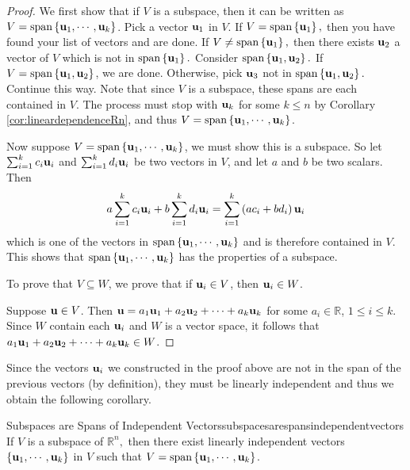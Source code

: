 \begin{proof}
We first show that if $V$ is a subspace, then it can be written as $V= \mbox{span}\left\{ {\bf u}_{1},\cdots ,{\bf u}_{k}\right\}$. Pick a vector ${\bf u}_{1}$ in $V$. If $V=
\mbox{span}\left\{ {\bf u}_{1}\right\} ,$ then you have found your
list of vectors and are done. If $V\neq \mbox{span}\left\{ {\bf u}_{1}\right\} ,$ then
there exists ${\bf u}_{2}$ a vector of $V$ which is not in $
\mbox{span}\left\{ {\bf u}_{1}\right\} .$ Consider $\mbox{span}\left\{ 
{\bf u}_{1},{\bf u}_{2}\right\}.$ 
If $V=\mbox{span}\left\{ {\bf u}_{1},{\bf u}_{2}\right\}$, we are
done. Otherwise, pick ${\bf u}_{3}$ not in $\mbox{span}\left\{ {\bf u}_{1},{\bf u}_{2}\right\} .$ Continue this way.
Note that since $V $ is a subspace, these spans are each contained in
$V$.  The process must stop with ${\bf u}_{k}$ for some $k\leq n$
by Corollary \ref{cor:lineardependenceRn}, and thus $V=\mbox{span}\left\{ {\bf u}_{1},\cdots ,
{\bf u}_{k}\right\}$.

Now suppose $V=\mbox{span}\left\{ {\bf u}_{1},\cdots ,
{\bf u}_{k}\right\}$, we must show this is a subspace. So let $\sum_{i=1}^{k}c_{i}{\bf u}_{i}$ and $
\sum_{i=1}^{k}d_{i}{\bf u}_{i}$ be two vectors in $V$, and let $a$
and $b$ be two scalars. Then 
\begin{equation*}
a \sum_{i=1}^{k}c_{i}{\bf u}_{i}+ b \sum_{i=1}^{k}d_{i}{\bf u}_{i}=
 \sum_{i=1}^{k}\left( a c_{i}+b  d_{i}\right) {\bf u}_{i}
\end{equation*}
which is one of the vectors in $\mbox{span}\left\{ {\bf u}_{1},\cdots ,
{\bf u}_{k}\right\}$ and is therefore contained in $V$. This shows that $\mbox{span}\left\{ {\bf u}_{1},\cdots ,{\bf u}_{k}\right\} $ has the properties of a subspace. 

To prove that $V \subseteq W$, we prove that if
${\bf u}_i\in V$, then ${\bf u}_i \in W$.

Suppose ${\bf u}\in V$. 
Then ${\bf u}=a_1{\bf u}_1 + a_2{\bf u}_2 + \cdots + a_k{\bf u}_k$
for some $a_i\in\mathbb{R}$, $1\leq i\leq k$.
Since $W$ contain each ${\bf u}_i$ and $W$ is a vector space, it follows that $ a_1{\bf u}_1 + a_2{\bf u}_2 + \cdots + a_k{\bf u}_k \in W$. 
\end{proof}

Since the vectors ${\bf u}_i$ we constructed in the proof above are not in the span
of the previous vectors (by definition), they must be linearly independent and thus we
obtain the following corollary.

\begin{corollary}{Subspaces are Spans of Independent Vectors}{subspacesarespansindependentvectors}
If $V$ is a subspace of $\mathbb{R}^{n},$ then there exist linearly independent 
vectors $\left\{ {\bf u}_{1},\cdots ,{\bf u}_{k}\right\}$ in $V$ such
that $V=\mbox{span}\left\{ {\bf u}_{1},\cdots ,{\bf u}_{k}\right\} $.
\end{corollary}

